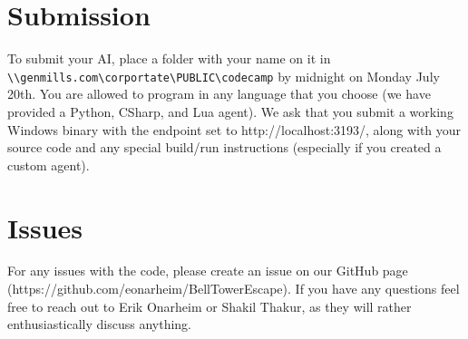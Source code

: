 \documentclass{article}
\begin{document}
\section*{Submission}
To submit your AI, place a folder with your name on it in \verb|\\genmills.com\corportate\PUBLIC\codecamp| by midnight on Monday July 20th. You are allowed to program in any language that you choose (we have provided a Python, CSharp, and Lua agent). We ask that you submit a working Windows binary with the endpoint set to http://localhost:3193/, along with your source code and any special build/run instructions (especially if you created a custom agent).

\section*{Issues}
For any issues with the code, please create an issue on our GitHub page (https://github.com/eonarheim/BellTowerEscape). If you have any questions feel free to reach out to Erik Onarheim or Shakil Thakur, as they will rather enthusiastically discuss anything.
\end{document}
